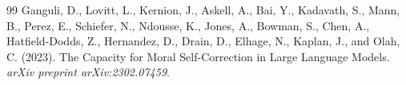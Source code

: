 \documentclass[11pt]{article}
\begin{document}
\begin{thebibliography}{99}
Ganguli, D., Lovitt, L., Kernion, J., Askell, A., Bai, Y., Kadavath, S., Mann, B., Perez, E., Schiefer, N., Ndousse, K., Jones, A., Bowman, S., Chen, A., Hatfield-Dodds, Z., Hernandez, D., Drain, D., Elhage, N., Kaplan, J., and Olah, C. (2023).
\newblock The Capacity for Moral Self-Correction in Large Language Models.
\newblock \emph{arXiv preprint arXiv:2302.07459}.

\end{thebibliography}
\end{document}
